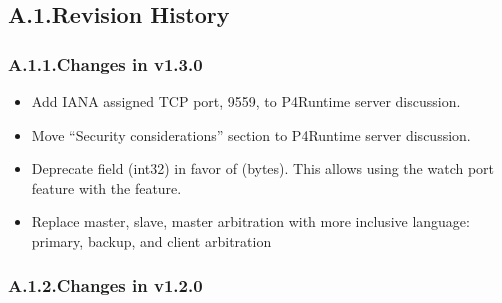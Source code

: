 \documentclass[11pt]{article}
\begin{document}
{%
\subsection{A.1.\hspace*{0.5em}Revision History}\label{sec-revision-history}%

\subsubsection{A.1.1.\hspace*{0.5em}Changes in v1.3.0}\label{sec-changes-in-v130}%

\begin{itemize}[noitemsep,topsep=\mdcompacttopsep]%

\item{}Add IANA assigned TCP port, 9559, to P4Runtime server discussion.%

\item{}Move \textquotedblleft{}Security considerations\textquotedblright{} section to P4Runtime server discussion.%

\item{}Deprecate  field (int32) in favor of  (bytes). This allows
using the watch port feature with the  feature.%

\item{}Replace master, slave, master arbitration with more inclusive language:
primary, backup, and client arbitration%
\end{itemize}%

\subsubsection{A.1.2.\hspace*{0.5em}Changes in v1.2.0}\label{sec-changes-in-v120}%

\begin{itemize}[noitemsep,topsep=\mdcompacttopsep]%


\end{itemize}}
\end{document}
